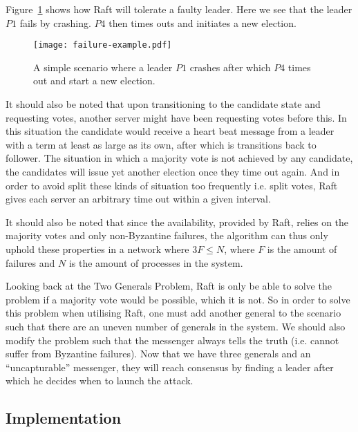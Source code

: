 Figure~\ref{fig:failure_example} shows how Raft will tolerate a faulty leader. Here we see that the leader $P1$ fails by crashing. $P4$ then times outs and initiates a new election.

\begin{figure}[ht!]
\centering
\texttt{[image: failure-example.pdf]}
\caption{A simple scenario where a leader $P1$ crashes after which $P4$ times out and start a new election.}
\label{fig:failure_example}
\end{figure}

It should also be noted that upon transitioning to the candidate state and requesting votes, another server might have been requesting votes before this. In this situation the candidate would receive a heart beat message from a leader with a term at least as large as its own, after which is transitions back to follower.
The situation in which a majority vote is not achieved by any candidate, the candidates will issue yet another election once they time out again. And in order to avoid split these kinds of situation too frequently i.e. split votes, Raft gives each server an arbitrary time out within a given interval.

It should also be noted that since the availability, provided by Raft, relies on the majority votes and only non-Byzantine failures, the algorithm can thus only uphold these properties in a network where $3F \leq N$, where $F$ is the amount of failures and $N$ is the amount of processes in the system.~\cite{Fischer}

Looking back at the Two Generals Problem, Raft is only be able to solve the problem if a majority vote would be possible, which it is not. So in order to solve this problem when utilising Raft, one must add another general to the scenario such that there are an uneven number of generals in the system. We should also modify the problem such that the messenger always tells the truth (i.e. cannot suffer from Byzantine failures). Now that we have three generals and an ``uncapturable'' messenger, they will reach consensus by finding a leader after which he decides when to launch the attack.



\subsection{Implementation} %
\label{sub:leader_election_implementation}


